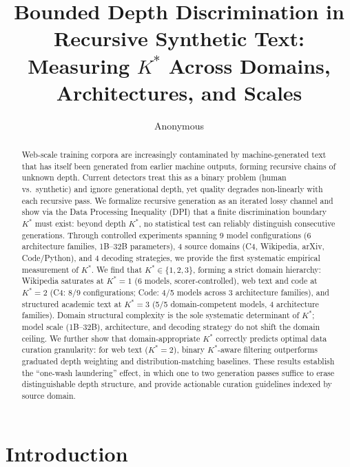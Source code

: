 \documentclass[11pt,a4paper]{article}
\title{Bounded Depth Discrimination in Recursive Synthetic Text:\\
  Measuring $K^{*}$ Across Domains, Architectures, and Scales}
\author{Anonymous}
\date{}
\newcommand{\kstar}{K^{*}}
\begin{document}
\maketitle

\begin{abstract}
Web-scale training corpora are increasingly contaminated by machine-generated text that has itself been generated from earlier machine outputs, forming recursive chains of unknown depth.
Current detectors treat this as a binary problem (human vs.\ synthetic) and ignore generational depth, yet quality degrades non-linearly with each recursive pass.
We formalize recursive generation as an iterated lossy channel and show via the Data Processing Inequality (DPI) that a finite discrimination boundary $\kstar$ must exist: beyond depth $\kstar$, no statistical test can reliably distinguish consecutive generations.
Through controlled experiments spanning 9 model configurations (6 architecture families, 1B--32B parameters), 4 source domains (C4, Wikipedia, arXiv, Code/Python), and 4 decoding strategies, we provide the first systematic empirical measurement of $\kstar$.
We find that $\kstar \in \{1,2,3\}$, forming a strict domain hierarchy: Wikipedia saturates at $\kstar\!=\!1$ (6 models, scorer-controlled), web text and code at $\kstar\!=\!2$ (C4: 8/9 configurations; Code: 4/5 models across 3 architecture families), and structured academic text at $\kstar\!=\!3$ (5/5 domain-competent models, 4 architecture families).
Domain structural complexity is the sole systematic determinant of $\kstar$; model scale (1B--32B), architecture, and decoding strategy do not shift the domain ceiling.
We further show that domain-appropriate $\kstar$ correctly predicts optimal data curation granularity: for web text ($\kstar\!=\!2$), binary $\kstar$-aware filtering outperforms graduated depth weighting and distribution-matching baselines.
These results establish the ``one-wash laundering'' effect, in which one to two generation passes suffice to erase distinguishable depth structure, and provide actionable curation guidelines indexed by source domain.
\end{abstract}

\section{Introduction}
\end{document}

